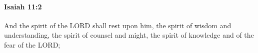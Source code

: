 
		\paragraph{Isaiah 11:2} %
			\label{ISAIAH-11-2}

			And the spirit of the LORD shall rest upon him, the spirit of wisdom and understanding, the spirit of counsel and might, the spirit of knowledge and of the fear of the LORD;


